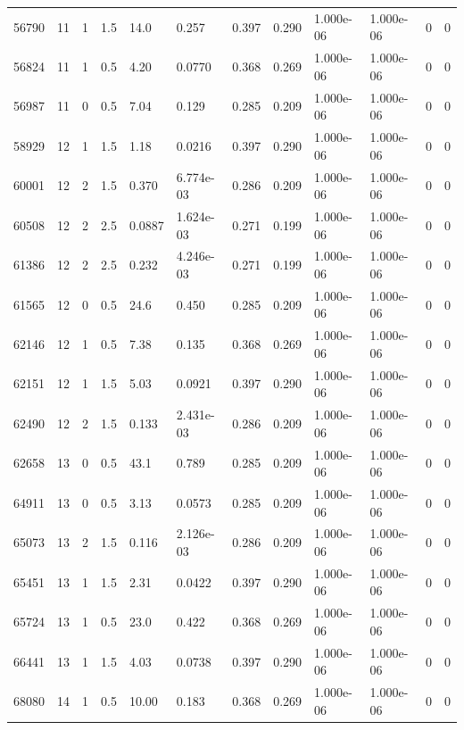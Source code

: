\documentclass[preview]{standalone}
\begin{document}
{{{\begin{tabular}{L{1.2cm}C{1.2cm} C{0.3cm}C{0.5cm} C{1.4cm}C{1.4cm} C{1.4cm}C{1.4cm} C{1.6cm}C{1.6cm} C{1.6cm}C{1.6cm}}
  56790  &    11  & 1     & 1.5 &  14.0  & 0.257  &  0.397&   0.290& 1.000e-06 & 1.000e-06   &  0 & 0  \\ 
  56824  &    11  & 1     & 0.5 &  4.20  & 0.0770  &  0.368&   0.269& 1.000e-06 & 1.000e-06   &  0 & 0  \\ 
  56987  &    11  & 0     & 0.5 &  7.04  & 0.129  &  0.285&   0.209& 1.000e-06 & 1.000e-06   &  0 & 0  \\ 
  58929  &    12  & 1     & 1.5 &  1.18  & 0.0216  &  0.397&   0.290& 1.000e-06 & 1.000e-06   &  0 & 0  \\ 
  60001  &    12  & 2     & 1.5 &  0.370  & 6.774e-03  &  0.286&   0.209& 1.000e-06 & 1.000e-06   &  0 & 0  \\ 
  60508  &    12  & 2     & 2.5 &  0.0887  & 1.624e-03  &  0.271&   0.199& 1.000e-06 & 1.000e-06   &  0 & 0  \\ 
  61386  &    12  & 2     & 2.5 &  0.232  & 4.246e-03  &  0.271&   0.199& 1.000e-06 & 1.000e-06   &  0 & 0  \\ 
  61565  &    12  & 0     & 0.5 &  24.6  & 0.450  &  0.285&   0.209& 1.000e-06 & 1.000e-06   &  0 & 0  \\ 
  62146  &    12  & 1     & 0.5 &  7.38  & 0.135  &  0.368&   0.269& 1.000e-06 & 1.000e-06   &  0 & 0  \\ 
  62151  &    12  & 1     & 1.5 &  5.03  & 0.0921  &  0.397&   0.290& 1.000e-06 & 1.000e-06   &  0 & 0  \\ 
  62490  &    12  & 2     & 1.5 &  0.133  & 2.431e-03  &  0.286&   0.209& 1.000e-06 & 1.000e-06   &  0 & 0  \\ 
  62658  &    13  & 0     & 0.5 &  43.1  & 0.789  &  0.285&   0.209& 1.000e-06 & 1.000e-06   &  0 & 0  \\ 
  64911  &    13  & 0     & 0.5 &  3.13  & 0.0573  &  0.285&   0.209& 1.000e-06 & 1.000e-06   &  0 & 0  \\ 
  65073  &    13  & 2     & 1.5 &  0.116  & 2.126e-03  &  0.286&   0.209& 1.000e-06 & 1.000e-06   &  0 & 0  \\ 
  65451  &    13  & 1     & 1.5 &  2.31  & 0.0422  &  0.397&   0.290& 1.000e-06 & 1.000e-06   &  0 & 0  \\ 
  65724  &    13  & 1     & 0.5 &  23.0  & 0.422  &  0.368&   0.269& 1.000e-06 & 1.000e-06   &  0 & 0  \\ 
  66441  &    13  & 1     & 1.5 &  4.03  & 0.0738  &  0.397&   0.290& 1.000e-06 & 1.000e-06   &  0 & 0  \\ 
  68080  &    14  & 1     & 0.5 &  10.00  & 0.183  &  0.368&   0.269& 1.000e-06 & 1.000e-06   &  0 & 0  \\ 

\end{tabular}}}}
\end{document}
